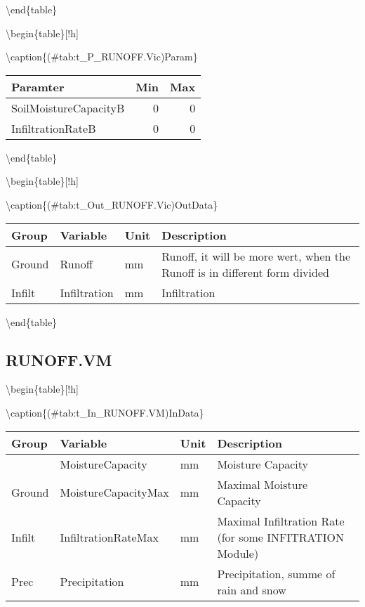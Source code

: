 \documentclass[
]{book}
\begin{document}
\textbackslash end\{table\}

\textbackslash begin\{table\}{[}!h{]}

\textbackslash caption\{(\#tab:t\_P\_RUNOFF.Vic)Param\}
\centering

\begin{tabular}[t]{l|r|r}
\hline
Paramter & Min & Max\\
\hline
SoilMoistureCapacityB & 0 & 0\\
\cline{1-3}
InfiltrationRateB & 0 & 0\\
\hline
\end{tabular}

\textbackslash end\{table\}

\textbackslash begin\{table\}{[}!h{]}

\textbackslash caption\{(\#tab:t\_Out\_RUNOFF.Vic)OutData\}
\centering

\begin{tabular}[t]{l|l|l|l}
\hline
Group & Variable & Unit & Description\\
\hline
Ground & Runoff & mm & Runoff, it will be more wert, when the Runoff is in different form divided\\
\cline{1-4}
Infilt & Infiltration & mm & Infiltration\\
\hline
\end{tabular}

\textbackslash end\{table\}

\hypertarget{runoff.vm}{%
\subsection{RUNOFF.VM}\label{runoff.vm}}

\textbackslash begin\{table\}{[}!h{]}

\textbackslash caption\{(\#tab:t\_In\_RUNOFF.VM)InData\}
\centering

\begin{tabular}[t]{l|l|l|l}
\hline
Group & Variable & Unit & Description\\
\hline
 & MoistureCapacity & mm & Moisture Capacity\\
\cline{2-4}
\multirow{-2}{*}{\raggedright\arraybackslash Ground} & MoistureCapacityMax & mm & Maximal Moisture Capacity\\
\cline{1-4}
Infilt & InfiltrationRateMax & mm & Maximal Infiltration Rate (for some INFITRATION Module)\\
\cline{1-4}
Prec & Precipitation & mm & Precipitation, summe of rain and snow\\
\hline
\end{tabular}
\end{document}

